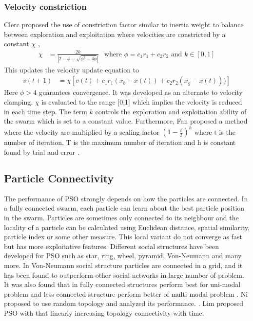 \documentclass{article}
\begin{document}
\subsubsection{Velocity constriction}
Clerc  proposed the use of constriction factor similar to inertia weight to balance between exploration and exploitation where velocities are constricted by a constant $\chi$ \cite{clerc1999swarm},
\begin{align*}
\chi &= \frac{2k}{|2-\phi - \sqrt{\phi^2 - 4\phi}|} & \text{where } \phi = c_1 r_1 + c_2 r_2 \text{ and } k \in [0,1]
\end{align*}
This updates the velocity update equation to 
\begin{align*}v(t+1) &= \chi[v(t) + c_1r_1(x_b - x(t)) + c_2r_2(x_g - x(t)))]\end{align*}
Here $\phi > 4$  guarantees convergence. It was developed as an alternate to velocity clamping. $\chi$ is evaluated to the range [0,1] which implies the velocity is reduced in each time step. The term $k$ controls the exploration and exploitation ability of the swarm which is set to a constant value. Furthermore, Fan proposed a method where the velocity are multiplied by a scaling factor $(1 - \frac{t}{T})^h$ where t is the number of iteration, T is the maximum number of iteration and h is constant found by trial and error \cite{fan2002modification}.




\subsection{Particle Connectivity}
The performance of PSO strongly depends on how the particles are connected. In a fully connected swarm, each particle can learn about the best particle position in the swarm. Particles are sometimes only connected to its neighbour and the locality of a particle can be calculated using Euclidean distance, spatial similarity, particle index or some other measure. This local variant do not converge as fast but has more exploitative features. Different social structures have been developed for PSO such as star, ring, wheel, pyramid, Von-Neumann and many more. In Von-Neumann social structure particles are connected in a grid, and it has been found to outperform other social networks in large number of problem. It was also found that in fully connected structures perform best for uni-modal problem and less connected structure perform better of multi-modal problem \cite{kennedy1999small}. Ni proposed to use random topology and analyzed its performance. \cite{ni2013new}. Lim proposed PSO with that linearly increasing topology connectivity with time.
\end{document}
